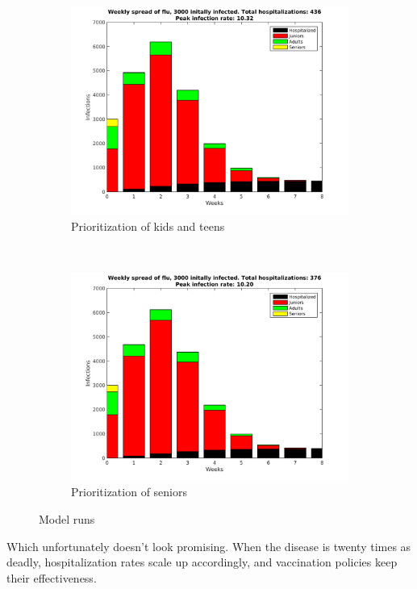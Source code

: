 \documentclass[titlepage]{article}
\begin{document}
\begin{figure}[h!]
\begin{subfigure}[b]{0.5\textwidth}
		\centering
		\includegraphics[width=\textwidth]{figures/Weekly-juniors.png}
		\caption{Prioritization of kids and teens}
	\end{subfigure}~
	\begin{subfigure}[b]{0.5\textwidth}
		\centering
		\includegraphics[width=\textwidth]{figures/Weekly-seniors.png}
		\caption{Prioritization of seniors}
	\end{subfigure}
	\caption{Model runs}
	\label{fig:modelout}
\end{figure}

Which unfortunately doesn't look promising. When the disease is twenty times as deadly, hospitalization rates scale up accordingly, and vaccination policies keep their effectiveness.
\end{document}
